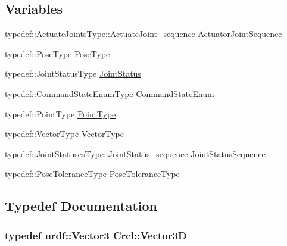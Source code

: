 \subsection*{Variables}
\begin{DoxyCompactItemize}
\item 
typedef\-::\-Actuate\-Joints\-Type\-::\-Actuate\-Joint\-\_\-sequence \hyperlink{namespaceCrcl_af084766e8e2d38a135cc67ef54d9904d}{Actuator\-Joint\-Sequence}
\item 
typedef\-::\-Pose\-Type \hyperlink{namespaceCrcl_acc6c82b52280f4d0e74b82a92400956e}{Pose\-Type}
\item 
typedef\-::\-Joint\-Status\-Type \hyperlink{namespaceCrcl_a687707df3e92b0a1821bec2a0194039f}{Joint\-Status}
\item 
typedef\-::\-Command\-State\-Enum\-Type \hyperlink{namespaceCrcl_a5b3aa14f2f4ed63cc67ecba8eaab5c93}{Command\-State\-Enum}
\item 
typedef\-::\-Point\-Type \hyperlink{namespaceCrcl_a04f09d617642257f5938e52cee2feeef}{Point\-Type}
\item 
typedef\-::\-Vector\-Type \hyperlink{namespaceCrcl_ae868d4ece511d1485ed5d9118395aef8}{Vector\-Type}
\item 
typedef\-::\-Joint\-Statuses\-Type\-::\-Joint\-Status\-\_\-sequence \hyperlink{namespaceCrcl_a8e2d423195eeffb85b45b63f595f2825}{Joint\-Status\-Sequence}
\item 
typedef\-::\-Pose\-Tolerance\-Type \hyperlink{namespaceCrcl_ac805071e16341b82d4fa4e12b7f3ac6f}{Pose\-Tolerance\-Type}
\end{DoxyCompactItemize}


\subsection{Typedef Documentation}
\hypertarget{namespaceCrcl_a1b424aa4904c32a427cc66b566babf49}{
\subsubsection[{Vector3\-D}]{\setlength{\rightskip}{0pt plus 5cm}typedef urdf\-::\-Vector3 {\bf Crcl\-::\-Vector3\-D}}}\label{namespaceCrcl_a1b424aa4904c32a427cc66b566babf49}


